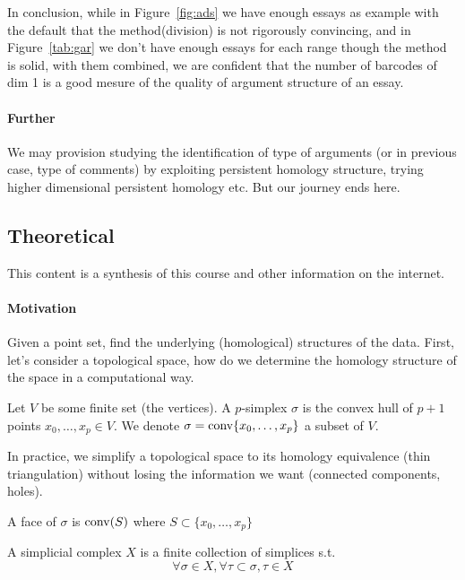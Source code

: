 In conclusion, while in Figure~\ref{fig:ads} we have enough essays as example with the default that
the method(division) is not rigorously convincing, and in Figure~\ref{tab:gar} we don't
have enough essays for each range though the method is solid, with them combined,
we are confident that the number of barcodes of dim 1 is a good mesure of the quality of
argument structure of an essay.

\paragraph{Further} We may provision studying the identification of type
of arguments (or in previous case, type of comments) by exploiting persistent homology structure,
trying higher dimensional persistent homology etc. But our journey ends here.

\subsection{Theoretical}
\label{theoretical}

This content is a synthesis of this course\cite{INF556} and other
information on the internet.

\paragraph{Motivation} Given a point set, find the underlying (homological) structures of
the data. First, let's consider a topological space, how do we determine
the homology structure of the space in a computational way.

\begin{definition}[$p$-simplex ($p\in\N$)]
  Let $V$ be some finite set (the vertices).
  A $p$-simplex $\sigma$ is the convex hull of $p+1$
  points $x_0, \ldots, x_p \in V$.
  We denote $\sigma = \operatorname{conv}\{x_0, \ldots, x_p\}$ a subset of $V$.
\end{definition}
\RM In practice, we simplify a topological space to its homology equivalence (thin
triangulation) without
losing the information we want (connected components, holes).

\begin{definition}[Face]
  A face of $\sigma$ is $\operatorname{conv}(S)$ where $S\subset\{x_0,\ldots, x_p\}$
\end{definition}

\begin{definition}
  A simplicial complex $X$ is a finite collection of simplices s.t.
  $$
  \forall \sigma\in X, \forall \tau\subset\sigma, \tau\in X
  $$
\end{definition}

